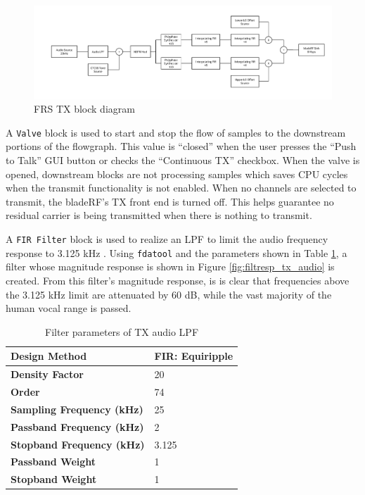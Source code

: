 \begin{figure}[h]
  \centering
  \includegraphics[width=6.5in]{images/frs/bladeRF_FRS_TX_block_diagram.pdf}
  \caption{FRS TX block diagram}
  \label{fig:frs_tx_block_diagram}
\end{figure}

A \texttt{Valve} block is used to start and stop the flow of samples to the
downstream portions of the flowgraph. This value is ``closed'' when the user
presses the ``Push to Talk'' \ac{GUI} button or checks the ``Continuous \ac{TX}'' checkbox.
When the valve is opened, downstream blocks are not processing samples which
saves CPU cycles when the transmit functionality is not enabled. When no channels
are selected to transmit, the bladeRF's \ac{TX} front end is turned off.  This
helps guarantee no residual carrier is being transmitted when there is nothing
to transmit.

A \texttt{\ac{FIR} Filter} block is used to realize an \ac{LPF} to limit the
audio frequency response to 3.125 kHz \cite{FCC_PART_95B}. Using
\texttt{fdatool} and the parameters shown in Table \ref{tab:filt_tx_audio},
a filter whose magnitude response is shown in Figure \ref{fig:filtresp_tx_audio}
is created.  From this filter's magnitude response, is is clear that
frequencies above the 3.125 kHz limit are attenuated by 60 dB, while the vast
majority of the human vocal range is passed.

\begin{table}[h]
  \centering
  \caption{Filter parameters of TX audio LPF}
  \label{tab:filt_tx_audio}
  \footnotesize
  \begin{tabular} {|l|l|}
    \hline
    \textbf{Design Method}              & FIR: Equiripple \\ \hline
    \textbf{Density Factor}             & 20              \\ \hline
    \textbf{Order}                      & 74              \\ \hline
    \textbf{Sampling Frequency (kHz)}   & 25              \\ \hline
    \textbf{Passband Frequency (kHz)}   & 2               \\ \hline
    \textbf{Stopband Frequency (kHz)}   & 3.125           \\ \hline
    \textbf{Passband Weight}            & 1               \\ \hline
    \textbf{Stopband Weight}            & 1               \\ \hline
  \end{tabular}
\end{table}


